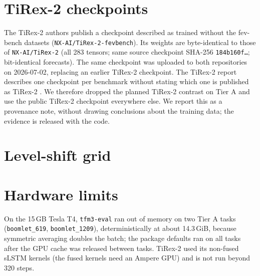 \section{TiRex-2 checkpoints}
\label{app:tirex}

The TiRex-2 authors publish a checkpoint described as trained without the fev-bench datasets (\texttt{NX-AI/TiRex-2-fevbench}).
Its weights are byte-identical to those of \texttt{NX-AI/TiRex-2} (all 283
tensors; same source checkpoint SHA-256 \texttt{184b160f\ldots}; bit-identical forecasts). The same checkpoint was uploaded to both
repositories on 2026-07-02, replacing an earlier TiRex-2 checkpoint. The TiRex-2 report describes one checkpoint per benchmark
without stating which one is published as TiRex-2 \citep{podest2026tirex2}. We therefore dropped the planned TiRex-2 contrast on
Tier A and use the public TiRex-2 checkpoint everywhere else. We report this as a provenance note, without drawing conclusions about
the training data; the evidence is released with the code.

\section{Level-shift grid}
\label{app:regime}

\begin{table}[!htbp]
\centering
\caption{Level-shift grid (added after the freeze; not pre-specified): MASE of TimesFM~3 relative to the best classical model of each
cell and to Chronos-2 (Figure~\ref{fig:regime}), by size of the shift (standard deviations of the noise) and steps between the shift and the origin; 100
replications per cell, context 1{,}024, horizon 48. The best classical model is chosen per cell after seeing the results;
the ratios to the fixed statistical ensemble are in \texttt{reports/robustness\_extra.json}.}
\label{tab:regime}
\scriptsize

\end{table}

\section{Hardware limits}
\label{app:hardware}

On the 15\,GB Tesla T4, \texttt{tfm3-eval} ran out of memory on two Tier A tasks (\texttt{boomlet\_619}, \texttt{boomlet\_1209}),
deterministically at about 14.3\,GiB, because symmetric averaging doubles the batch; the package defaults ran on all tasks after the
GPU cache was released between tasks. TiRex-2 used its non-fused sLSTM kernels (the fused kernels need an Ampere GPU) and is not
run beyond 320 steps.

